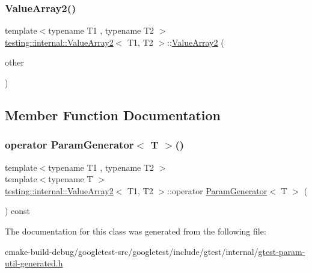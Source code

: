 \mbox{\label{classtesting_1_1internal_1_1ValueArray2_ac0da580bf4f38494da741c7140a7927d}} 
\subsubsection{\texorpdfstring{ValueArray2()}{ValueArray2()}\hspace{0.1cm}{\footnotesize\ttfamily [2/2]}}
{\footnotesize\ttfamily template$<$typename T1 , typename T2 $>$ \\
\mbox{\hyperlink{classtesting_1_1internal_1_1ValueArray2}{testing\+::internal\+::\+Value\+Array2}}$<$ T1, T2 $>$\+::\mbox{\hyperlink{classtesting_1_1internal_1_1ValueArray2}{Value\+Array2}} (\begin{DoxyParamCaption}\item[{const \mbox{\hyperlink{classtesting_1_1internal_1_1ValueArray2}{Value\+Array2}}$<$ T1, T2 $>$ \&}]{other }\end{DoxyParamCaption})\hspace{0.3cm}{\ttfamily [inline]}}



\subsection{Member Function Documentation}
\mbox{\label{classtesting_1_1internal_1_1ValueArray2_aa81899f10bfd345c17aae540acc296a9}} 
\subsubsection{\texorpdfstring{operator ParamGenerator$<$ T $>$()}{operator ParamGenerator< T >()}}
{\footnotesize\ttfamily template$<$typename T1 , typename T2 $>$ \\
template$<$typename T $>$ \\
\mbox{\hyperlink{classtesting_1_1internal_1_1ValueArray2}{testing\+::internal\+::\+Value\+Array2}}$<$ T1, T2 $>$\+::operator \mbox{\hyperlink{classtesting_1_1internal_1_1ParamGenerator}{Param\+Generator}}$<$ T $>$ (\begin{DoxyParamCaption}{ }\end{DoxyParamCaption}) const\hspace{0.3cm}{\ttfamily [inline]}}



The documentation for this class was generated from the following file\+:\begin{DoxyCompactItemize}
\item 
cmake-\/build-\/debug/googletest-\/src/googletest/include/gtest/internal/\mbox{\hyperlink{gtest-param-util-generated_8h}{gtest-\/param-\/util-\/generated.\+h}}\end{DoxyCompactItemize}
